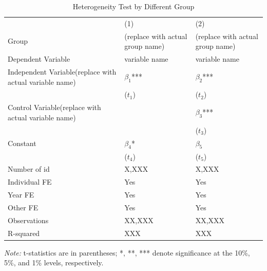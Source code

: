\begin{table}[htbp]
    \caption{Heterogeneity Test by Different Group}
    \label{Use the regression name as the label}
    \centering
    \begin{tabular}{p{3.6cm}p{3.6cm}p{3.6cm}} %
    \toprule
    & (1) & (2) \\
    Group & (replace with actual group name)  & (replace with actual group name)  \\
    Dependent Variable & variable name & variable name \\
    \midrule
    Independent Variable(replace with actual variable name)   & $\beta_1$*** & $\beta_2$*** \\
                & ($t_1$) & ($t_2$) \\
    Control Variable(replace with actual variable name)     &  & $\beta_3$*** \\  %
                &  & ($t_3$) \\
    Constant    & $\beta_4$* & $\beta_5$ \\
                & ($t_4$) & ($t_5$) \\
    
    Number of id       & X,XXX        & X,XXX \\
    Individual FE      & Yes         & Yes \\ %
    Year FE            & Yes         & Yes \\ %
    Other FE           & Yes         & Yes \\ %
    Observations       & XX,XXX       & XX,XXX \\
    R-squared          & XXX        & XXX \\
    \bottomrule
    \end{tabular}
    \begin{tablenotes}
    \small
    \item \textit{Note:} t-statistics are in parentheses; *, **, *** denote significance at the 10\%, 5\%, and 1\% levels, respectively.
    \end{tablenotes}
    \end{table}